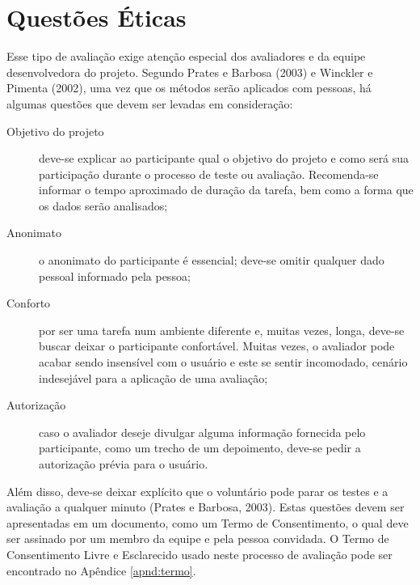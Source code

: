 %

\section{Questões Éticas}

Esse tipo de avaliação exige atenção especial dos avaliadores e da equipe desenvolvedora do projeto. Segundo Prates e Barbosa (2003) e Winckler e Pimenta (2002), uma vez que os métodos serão aplicados com pessoas, há algumas questões que devem ser levadas em consideração:
    \begin{description}
        \item [Objetivo do projeto] deve-se explicar ao participante qual o objetivo do projeto e como será sua participação durante o processo de teste ou avaliação. Recomenda-se informar o tempo aproximado de duração da tarefa, bem como a forma que os dados serão analisados;
        \item [Anonimato] o anonimato do participante é essencial; deve-se omitir qualquer dado pessoal informado pela pessoa;
        \item [Conforto] por ser uma tarefa num ambiente diferente e, muitas vezes, longa, deve-se buscar deixar o participante confortável. Muitas vezes, o avaliador pode acabar sendo insensível com o usuário e este se sentir incomodado, cenário indesejável para a aplicação de uma avaliação;
        \item [Autorização] caso o avaliador deseje divulgar alguma informação fornecida pelo participante, como um trecho de um depoimento, deve-se pedir a autorização prévia para o usuário.
    \end{description}
Além disso, deve-se deixar explícito que o voluntário pode parar os testes e a avaliação a qualquer minuto (Prates e Barbosa, 2003). Estas questões devem ser apresentadas em um documento, como um Termo de Consentimento, o qual deve ser assinado por um membro da equipe e pela pessoa convidada. O Termo de Consentimento Livre e Esclarecido usado neste processo de avaliação pode ser encontrado no Apêndice \ref{apnd:termo}.
